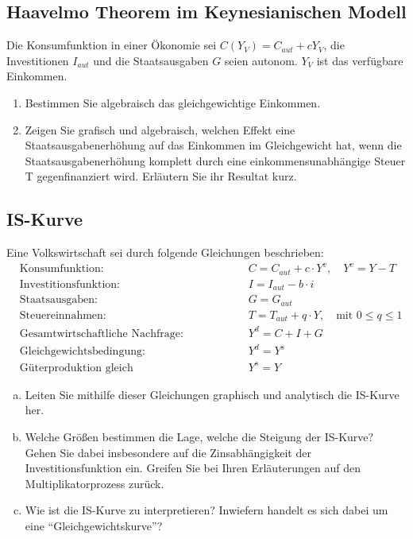 \documentclass{scrartcl}
\begin{document}
\subsection{Haavelmo Theorem im Keynesianischen Modell}
Die Konsumfunktion in einer Ökonomie sei $C(Y_V)=C_{aut}+c Y_V$, die Investitionen $I_{aut}$ und die Staatsausgaben $G$ seien autonom. $Y_V$ ist das verfügbare Einkommen.
\begin{enumerate}
	\item Bestimmen Sie algebraisch das gleichgewichtige Einkommen.
	\item Zeigen Sie grafisch und algebraisch, welchen Effekt eine Staatsausgabenerhöhung auf das Einkommen im Gleichgewicht hat, wenn die Staatsausgabenerhöhung komplett durch eine einkommensunabhängige Steuer T gegenfinanziert wird. Erläutern Sie ihr Resultat kurz.
\end{enumerate}


\subsection{IS-Kurve}
Eine Volkswirtschaft sei durch folgende Gleichungen beschrieben:
\begin{align*}
&\text{Konsumfunktion: } &\quad& C = C_{aut} + c\cdot Y^v, \quad  Y^v=Y-T\\
&\text{Investitionsfunktion: } &\quad&I = I_{aut}-b\cdot i\\
&\text{Staatsausgaben: } &\quad& G=G_{aut}\\
&\text{Steuereinnahmen: } &\quad& T=T_{aut} + q\cdot Y, \quad \text{mit } 0\leq q\leq 1\\
&\text{Gesamtwirtschaftliche Nachfrage: } &\quad&Y^d = C + I + G\\
&\text{Gleichgewichtsbedingung: } &\quad&Y^d = Y^s\\
&\text{Güterproduktion gleich Volkseinkommen: } &\quad& Y^s = Y
\end{align*}
\begin{enumerate}[(a)]
	\item Leiten Sie mithilfe dieser Gleichungen graphisch und analytisch
	die IS-Kurve her.
	\item Welche Größen bestimmen die Lage, welche die Steigung der
	IS-Kurve? Gehen Sie dabei insbesondere auf die Zinsabhängigkeit der
	Investitionsfunktion ein. Greifen Sie bei Ihren Erläuterungen auf
	den Multiplikatorprozess zurück.
	\item Wie ist die IS-Kurve zu interpretieren? Inwiefern handelt es sich
	dabei um eine \enquote{Gleichgewichtskurve}?
\end{enumerate}
\end{document}

